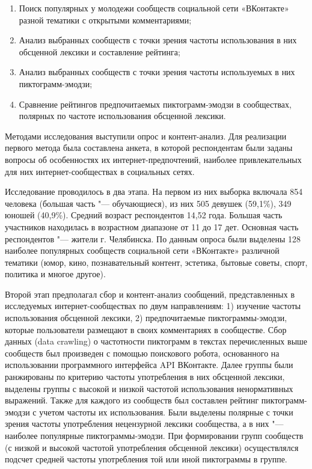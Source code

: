 \begin{enumerate}
	\item Поиск популярных у молодежи сообществ социальной сети «ВКонтакте» разной тематики с открытыми комментариями;
	\item Анализ выбранных сообществ с точки зрения частоты использования в них обсценной лексики и составление рейтинга;
	\item Анализ выбранных сообществ с точки зрения частоты используемых в них пиктограмм-эмодзи;
	\item Сравнение рейтингов предпочитаемых пиктограмм-эмодзи в сообществах, полярных по частоте использования обсценной лексики.
\end{enumerate}

Методами исследования выступили опрос и контент-анализ. Для реализации первого метода была составлена анкета, в которой респондентам были заданы вопросы об особенностях их интернет-предпочтений, наиболее привлекательных для них интернет-сообществах в социальных сетях.

Исследование проводилось в два этапа. На первом из них выборка включала 854 человека (большая часть "--- обучающиеся), из них 505 девушек (59,1\%), 349 юношей (40,9\%). Средний возраст респондентов 14,52 года. Большая часть участников находилась в возрастном диапазоне от 11 до 17 дет. Основная часть респондентов "--- жители г. Челябинска. По данным опроса были выделены 128 наиболее популярных сообществ социальной сети «ВКонтакте» различной тематики (юмор, кино, познавательный контент, эстетика, бытовые советы, спорт, политика и многое другое).

Второй этап предполагал сбор и контент-анализ сообщений, представленных в исследуемых интернет-сообществах по двум направлениям: 1) изучение частоты использования обсценной лексики, 2) предпочитаемые пиктограммы-эмодзи, которые пользователи размещают в своих комментариях в сообществе. Сбор данных (data crawling) о частотности пиктограмм в текстах перечисленных выше сообществ был произведен с помощью поискового робота, основанного на использовании программного интерфейса API ВКонтакте. Далее группы были ранжированы по критерию частоты употребления в них обсценной лексики, выделены группы с высокой и низкой частотой использования ненормативных выражений. Также для каждого из сообществ был составлен рейтинг пиктограмм-эмодзи с учетом частоты их использования. Были выделены полярные с точки зрения частоты употребления нецензурной лексики сообщества, а в них "--- наиболее популярные пиктограммы-эмодзи. При формировании групп сообществ (с низкой и высокой частотой употребления обсценной лексики) осуществлялся подсчет средней частоты употребления той или иной пиктограммы в группе.

